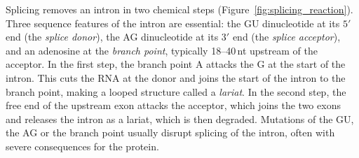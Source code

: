 Splicing removes an intron in two chemical steps (Figure~\ref{fig:splicing_reaction}). Three sequence features of the intron are essential: the GU dinucleotide at its $5'$ end (the \emph{splice donor}), the AG dinucleotide at its $3'$ end (the \emph{splice acceptor}), and an adenosine at the \emph{branch point}, typically 18--40\,nt upstream of the acceptor. In the first step, the branch point A attacks the G at the start of the intron. This cuts the RNA at the donor and joins the start of the intron to the branch point, making a looped structure called a \emph{lariat}. In the second step, the free end of the upstream exon attacks the acceptor, which joins the two exons and releases the intron as a lariat, which is then degraded. Mutations of the GU, the AG or the branch point usually disrupt splicing of the intron, often with severe consequences for the protein.

